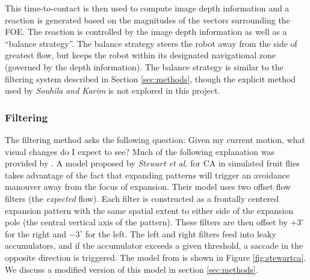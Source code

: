 \documentclass[a4paper,12pt,twoside,openright]{article}
\begin{document}
This time-to-contact is then used to compute image depth information and a reaction is generated based on the
magnitudes of the vectors surrounding the FOE. The reaction is controlled by the image depth information
as well as a ``balance strategy''. The balance strategy steers the robot away from the side of greatest
flow, but keeps the robot within its designated navigational zone (governed by the depth information). The
balance strategy is similar to the filtering system described in Section \ref{sec:methods}, though
the explicit method used by \textit{Souhila and Karim} is not explored in this project.

\subsubsection{ Filtering }
The filtering method asks the following question: Given my current motion, what visual changes do
I expect to see? Much of the following explanation was provided by \cite{Stewart2010}.
A model proposed by \textit{Stewart et al.} for CA in simulated fruit flies takes
advantage of the fact that expanding patterns will trigger an avoidance manouver away from the focus
of expansion\cite{Stewart2010}. Their model uses two offset flow filters (the \textit{expected}
flow). Each filter is constructed as a frontally centered expansion pattern with the same spatial
extent to either side of the expansion pole (the central vertical axis of the pattern). These filters
are then offset by $+3^{\circ}$ for the right and $-3^{\circ}$ for the left. The left and right
filters feed into leaky accumulators, and if the accumulator exceeds a given threshold, a saccade
in the opposite direction is triggered. The model from \cite{Stewart2010} is shown in Figure
\ref{fig:stewartca}. We discuss a modified version of this model in section
\ref{sec:methods}.
\end{document}

